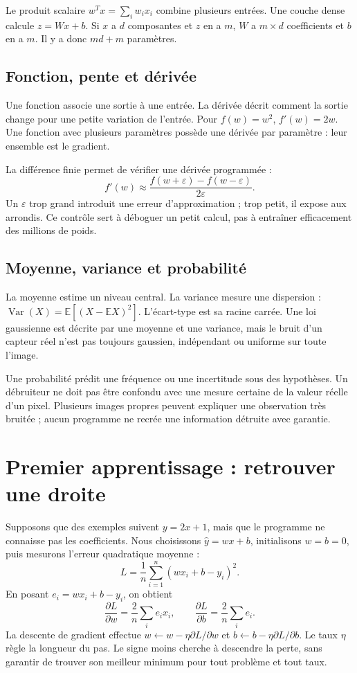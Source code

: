 \documentclass[12pt,a4paper,oneside]{report}
\begin{document}
Le produit scalaire $w^Tx=\sum_iw_ix_i$ combine plusieurs entrées. Une couche
dense calcule $z=Wx+b$. Si $x$ a $d$ composantes et $z$ en a $m$, $W$ a
$m\times d$ coefficients et $b$ en a $m$. Il y a donc $md+m$ paramètres.

\section{Fonction, pente et dérivée}

Une fonction associe une sortie à une entrée. La dérivée décrit comment la
sortie change pour une petite variation de l'entrée. Pour $f(w)=w^2$,
$f'(w)=2w$. Une fonction avec plusieurs paramètres possède une dérivée par
paramètre : leur ensemble est le gradient.

La différence finie permet de vérifier une dérivée programmée :
\[
 f'(w)\approx\frac{f(w+\varepsilon)-f(w-\varepsilon)}{2\varepsilon}.
\]
Un $\varepsilon$ trop grand introduit une erreur d'approximation ; trop petit,
il expose aux arrondis. Ce contrôle sert à déboguer un petit calcul, pas à
entraîner efficacement des millions de poids.

\section{Moyenne, variance et probabilité}

La moyenne estime un niveau central. La variance mesure une dispersion :
$\operatorname{Var}(X)=\mathbb{E}[(X-\mathbb{E}X)^2]$. L'écart-type est sa
racine carrée. Une loi gaussienne est décrite par une moyenne et une variance,
mais le bruit d'un capteur réel n'est pas toujours gaussien, indépendant ou
uniforme sur toute l'image.

Une probabilité prédit une fréquence ou une incertitude sous des hypothèses.
Un débruiteur ne doit pas être confondu avec une mesure certaine de la valeur
réelle d'un pixel. Plusieurs images propres peuvent expliquer une observation
très bruitée ; aucun programme ne recrée une information détruite avec garantie.

\chapter{Premier apprentissage : retrouver une droite}

Supposons que des exemples suivent $y=2x+1$, mais que le programme ne connaisse
pas les coefficients. Nous choisissons $\hat y=wx+b$, initialisons $w=b=0$,
puis mesurons l'erreur quadratique moyenne :
\[
 L=\frac1n\sum_{i=1}^n(wx_i+b-y_i)^2.
\]
En posant $e_i=wx_i+b-y_i$, on obtient
\[
 \frac{\partial L}{\partial w}=\frac2n\sum_i e_ix_i,
 \qquad \frac{\partial L}{\partial b}=\frac2n\sum_i e_i.
\]
La descente de gradient effectue $w\leftarrow w-\eta\partial L/\partial w$ et
$b\leftarrow b-\eta\partial L/\partial b$. Le taux $\eta$ règle la longueur
du pas. Le signe moins cherche à descendre la perte, sans garantir de trouver
son meilleur minimum pour tout problème et tout taux.
\end{document}
